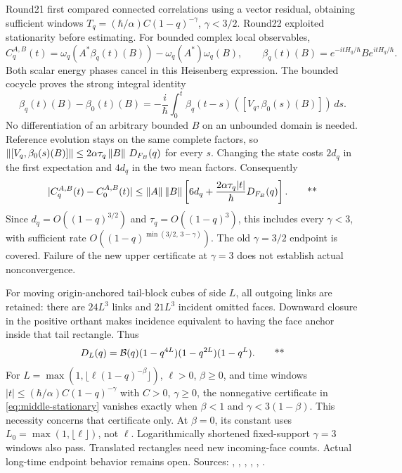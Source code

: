 Round21 first compared connected correlations using a vector residual,
obtaining sufficient windows
\(T_q=(\hbar/\alpha)C(1-q)^{-\gamma}\), \(\gamma<3/2\).
Round22 exploited stationarity before estimating. For bounded complex
local observables,
\[
 C_q^{A,B}(t)=
 \omega_q(A^*\beta_q(t)(B))-\omega_q(A^*)\omega_q(B),
 \qquad \beta_q(t)(B)=e^{-itH_q/\hbar}Be^{itH_q/\hbar}.
\]
Both scalar energy phases cancel in this Heisenberg expression.
The bounded cocycle proves the strong integral identity
\[
 \beta_q(t)(B)-\beta_0(t)(B)
 =-\frac{i}{\hbar}\int_0^t
 \beta_q(t-s)([V_q,\beta_0(s)(B)])\,ds.
\]
No differentiation of an arbitrary bounded \(B\) on an unbounded domain
is needed. Reference evolution stays on the same complete factors,
so \(\left\lVert [V_q,\beta_0(s)(B)]\right\rVert\le
2\alpha\tau_q\left\lVert B\right\rVert\,D_{F_B}(q)\) for every \(s\).
Changing the state costs \(2d_q\) in the first expectation and \(4d_q\)
in the two mean factors. Consequently
\begin{equation}
 |C_q^{A,B}(t)-C_0^{A,B}(t)|
 \le\left\lVert A\right\rVert\left\lVert B\right\rVert
 \left[6d_q+\frac{2\alpha\tau_q|t|}{\hbar}D_{F_B}(q)\right].
 \qquad\text{**}
 \label{eq:middle-stationary}
\end{equation}
Since \(d_q=O((1-q)^{3/2})\) and \(\tau_q=O((1-q)^3)\), this includes
every \(\gamma<3\), with sufficient rate
\(O((1-q)^{\min(3/2,\,3-\gamma)})\).
The old \(\gamma=3/2\) endpoint is covered. Failure of the new upper
certificate at \(\gamma=3\) does not establish actual nonconvergence.

For moving origin-anchored tail-block cubes of side \(L\), all outgoing
links are retained: there are \(24L^3\) links and \(21L^3\) incident
omitted faces. Downward closure in the positive orthant makes incidence
equivalent to having the face anchor inside that tail rectangle. Thus
\begin{equation}
 D_L(q)=\mathcal B(q)(1-q^{4L})(1-q^{2L})(1-q^L).
 \qquad\text{**}
 \label{eq:middle-moving}
\end{equation}
For \(L=\max(1,\lfloor\ell(1-q)^{-\beta}\rfloor)\),
\(\ell>0\), \(\beta\ge0\), and time windows
\(|t|\le (\hbar/\alpha)C(1-q)^{-\gamma}\) with \(C>0\), \(\gamma\ge0\),
the nonnegative certificate in \eqref{eq:middle-stationary} vanishes
exactly when
\(\beta<1\) and \(\gamma<3(1-\beta)\).
This necessity concerns that certificate only. At \(\beta=0\), its
constant uses \(L_0=\max(1,\lfloor\ell\rfloor)\), not \(\ell\).
Logarithmically shortened fixed-support \(\gamma=3\) windows also pass.
Translated rectangles need new incoming-face counts. Actual long-time
endpoint behavior remains open.
Sources: ,
,
,
,
,
.

